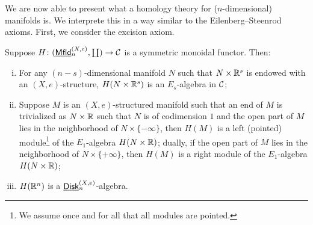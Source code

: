 \documentclass[twoside]{article}
\begin{document}
We are now able to present what a homology theory for ($n$-dimensional)
manifolds is. We interprete this in a way similar to the Eilenberg--Steenrod
axioms. First, we consider the excision axiom. 

\begin{proposition}\label{s}
    Suppose $H\colon(\underline{\smash{\mathsf{Mfld}}}_n^{(X,e)},\coprod)\to\cal C$ is a symmetric monoidal functor. Then:
    \begin{enumerate}[i)]
        \item For any $(n-s)$-dimensional manifold $N$ such that $N\times\mathbb{R}^s$ 
        is endowed with an $(X,e)$-structure, $H(N\times\mathbb{R}^s)$ is an $E_s$-algebra in
        $\cal C$;

        \item Suppose $M$ is an $(X,e)$-structured manifold such that an end of $M$
        is trivialized as $N\times\mathbb{R}$ such that $N$ is of codimension $1$ and the open
        part of $M$ lies in the neighborhood of $N\times\{-\infty\}$, then
        $H(M)$ is a left (pointed) module\footnote{We assume once and for all that
        all modules are pointed.} of the $E_1$-algebra $H(N\times\mathbb{R})$; dually, if
        the open part of $M$ lies in the neighborhood of $N\times\{+\infty\}$, then
        $H(M)$ is a right module of the $E_1$-algebra $H(N\times\mathbb{R})$;

        \item $H(\mathbb{R}^n)$ is a $\underline{\smash{\mathsf{Disk}}}_n^{(X,e)}$-algebra.
    \end{enumerate}
\end{proposition}
\end{document}
